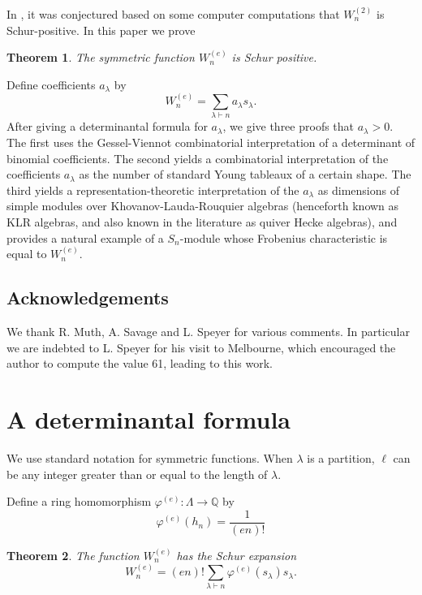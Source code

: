 \documentclass[11pt]{amsart}
\newcommand\la{\lambda}
\newcommand\La{\Lambda}
\newcommand\Q{\mathbb{Q}}
\newtheorem{theo}{Theorem}[section]
\theoremstyle{definition}
\numberwithin{equation}{section}
\begin{document}
In \cite[Conjecture 10.7]{spinbrauer}, it was conjectured based on some computer computations that $W_n^{(2)}$ is Schur-positive. In this paper we prove

\begin{theo}
The symmetric function $W_n^{(e)}$ is Schur positive.
\end{theo}

Define coefficients $a_\la$ by
\[
W_n^{(e)} = \sum_{\la\vdash n} a_\la s_\la.
\]
After giving a determinantal formula for $a_\la$, we give three proofs that $a_\la>0$. The first uses the Gessel-Viennot combinatorial interpretation of a determinant of binomial coefficients. The second yields a combinatorial interpretation of the coefficients $a_\la$ as the number of standard Young tableaux of a certain shape. The third yields a representation-theoretic interpretation of the $a_\la$ as dimensions of simple modules over Khovanov-Lauda-Rouquier algebras (henceforth known as KLR algebras, and also known in the literature as quiver Hecke algebras), and provides a natural example of a $S_n$-module whose Frobenius characteristic is equal to $W_n^{(e)}$.

\subsection*{Acknowledgements}

We thank R. Muth, A. Savage and L. Speyer for various comments. In particular we are indebted to L. Speyer for his visit to Melbourne, which encouraged the author to compute the value 61, leading to this work.



\section{A determinantal formula}

We use standard notation for symmetric functions. When $\lambda$ is a partition, $\ell$ can be any integer greater than or equal to the length of $\la$.


Define a ring homomorphism $\varphi^{(e)}:\La\to \Q$ by
\[
\varphi^{(e)}(h_n)= \frac{1}{(en)!}
\]

\begin{theo}\label{varphi}
The function $W_n^{(e)}$ has the Schur expansion
\[
W_n^{(e)} =  (en)!\sum_{\la \vdash n} \varphi^{(e)}(s_\la) s_\la.
\]
\end{theo}
\end{document}
